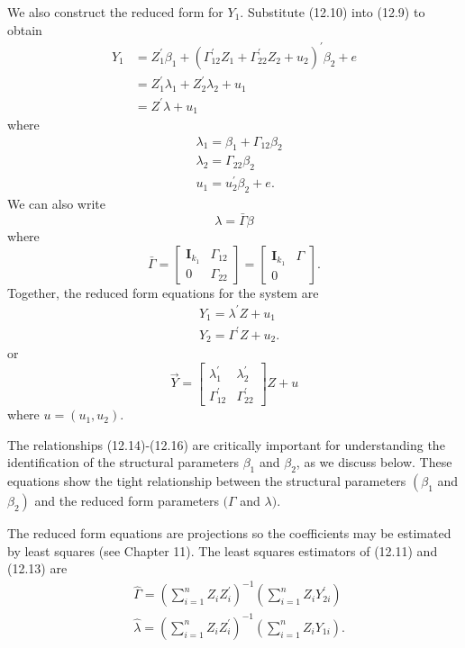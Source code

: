 \documentclass[10pt]{article}
\begin{document}
We also construct the reduced form for $Y_{1}$. Substitute (12.10) into (12.9) to obtain
$$
\begin{aligned}
Y_{1} &=Z_{1}^{\prime} \beta_{1}+\left(\Gamma_{12}^{\prime} Z_{1}+\Gamma_{22}^{\prime} Z_{2}+u_{2}\right)^{\prime} \beta_{2}+e \\
&=Z_{1}^{\prime} \lambda_{1}+Z_{2}^{\prime} \lambda_{2}+u_{1} \\
&=Z^{\prime} \lambda+u_{1}
\end{aligned}
$$
where
$$
\begin{aligned}
&\lambda_{1}=\beta_{1}+\Gamma_{12} \beta_{2} \\
&\lambda_{2}=\Gamma_{22} \beta_{2} \\
&u_{1}=u_{2}^{\prime} \beta_{2}+e .
\end{aligned}
$$
We can also write
$$
\lambda=\bar{\Gamma} \beta
$$
where
$$
\bar{\Gamma}=\left[\begin{array}{cc}
\boldsymbol{I}_{k_{1}} & \Gamma_{12} \\
0 & \Gamma_{22}
\end{array}\right]=\left[\begin{array}{cc}
\boldsymbol{I}_{k_{1}} & \Gamma \\
0 &
\end{array}\right] .
$$
Together, the reduced form equations for the system are
$$
\begin{aligned}
&Y_{1}=\lambda^{\prime} Z+u_{1} \\
&Y_{2}=\Gamma^{\prime} Z+u_{2} .
\end{aligned}
$$
or
$$
\vec{Y}=\left[\begin{array}{cc}
\lambda_{1}^{\prime} & \lambda_{2}^{\prime} \\
\Gamma_{12}^{\prime} & \Gamma_{22}^{\prime}
\end{array}\right] Z+u
$$
where $u=\left(u_{1}, u_{2}\right)$.

The relationships (12.14)-(12.16) are critically important for understanding the identification of the structural parameters $\beta_{1}$ and $\beta_{2}$, as we discuss below. These equations show the tight relationship between the structural parameters $\left(\beta_{1}\right.$ and $\left.\beta_{2}\right)$ and the reduced form parameters $(\Gamma$ and $\lambda)$.

The reduced form equations are projections so the coefficients may be estimated by least squares (see Chapter 11). The least squares estimators of (12.11) and (12.13) are
$$
\begin{aligned}
&\widehat{\Gamma}=\left(\sum_{i=1}^{n} Z_{i} Z_{i}^{\prime}\right)^{-1}\left(\sum_{i=1}^{n} Z_{i} Y_{2 i}^{\prime}\right) \\
&\widehat{\lambda}=\left(\sum_{i=1}^{n} Z_{i} Z_{i}^{\prime}\right)^{-1}\left(\sum_{i=1}^{n} Z_{i} Y_{1 i}\right) .
\end{aligned}
$$
\end{document}
